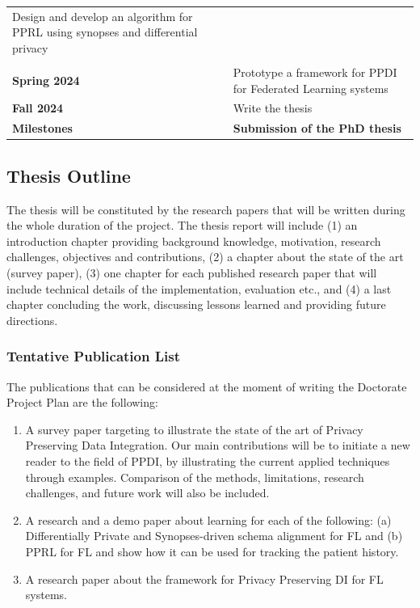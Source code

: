 \documentclass[12pt]{article}
\begin{document}
\begin{table}[h]
\begin{tabular}{lp{}}
       Design and develop an algorithm for PPRL using synopses and differential privacy \\                                                                              \\
       \midrule
       \textbf{Spring 2024}   &
       Prototype a framework for PPDI for Federated Learning systems                                         \\
       \midrule
       \textbf{Fall 2024} &
       Write the thesis                               \\
       \textbf{Milestones}  &
       \textbf{Submission of the PhD thesis}                                                              \\
       \bottomrule
   \end{tabular}
\end{table}

\subsection{Thesis Outline}
The thesis will be constituted by the research papers that will be written during the whole duration of
the project. The thesis report will include (1) an introduction chapter providing background knowledge,
motivation, research challenges, objectives and contributions, (2) a chapter about the state of the art
(survey paper), (3) one chapter for each published research paper that will include technical details of the
implementation, evaluation etc., and (4) a last chapter concluding the work, discussing lessons learned
and providing future directions.

\subsubsection{Tentative Publication List}
The publications that can be considered at the moment of writing the Doctorate Project Plan are the
following:
\begin{enumerate}
   \item A survey paper targeting to illustrate the state of the art of Privacy Preserving Data Integration. Our
   main contributions will be to initiate a new reader to the field of PPDI,
   by illustrating the current applied techniques through examples. Comparison of the methods,
   limitations, research challenges, and future work will also be included.
   \item A research and a demo paper about learning for each of the following: (a) Differentially Private and Synopses-driven schema alignment for FL and (b) PPRL for FL and show how it can be used 
   for tracking the patient history.
   \item A research paper about the framework for Privacy Preserving DI for FL systems.
\end{enumerate}
\end{document}
